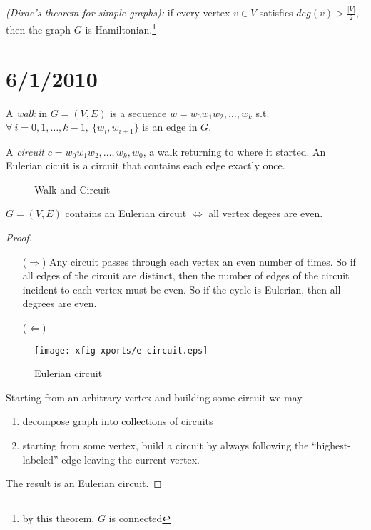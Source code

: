 \documentclass{article}
\begin{document}
\begin{thm}
\emph{(Dirac's theorem for simple graphs):} if every vertex $v \in V$ satisfies $deg(v)> \frac{|V|}{2}$, then the graph $G$ is Hamiltonian.\footnote{by this theorem, $G$ is connected}
\end{thm}




\section*{6/1/2010}

\begin{defn}
A \emph{walk} in $G=(V,E)$ is a sequence $w=w_0 w_1 w_2,\ldots,w_k$ s.t. $\forall ~i = 0,1,\ldots,k-1,~ \{w_i, w_{i+1}\}$ is an edge in $G$.
\end{defn}

\begin{defn}
A \emph{circuit} $c=w_0 w_1 w_2,\ldots,w_k,w_0$, a walk returning to where it started. An Eulerian cicuit is a circuit that contains each edge exactly once.
\end{defn}


\begin{figure}[H]
\centering
\caption{Walk and Circuit}
\qquad \quad
{}
\end{figure}



\begin{thm}
$G=(V,E)$ contains an Eulerian circuit $\iff$ all vertex degees are even.
\end{thm}

\begin{proof}
\begin{itemize}
{}    
 \item[($\Rightarrow$)] Any circuit passes through each vertex an even number of times.  So if all edges of the circuit are distinct, then the number of edges of the circuit incident to each vertex must be even.  So if the cycle is Eulerian, then all degrees are even.
\item[($\Leftarrow$)]
\end{itemize}
\begin{figure}[H]
\caption{Eulerian circuit}
\centering
\texttt{[image: xfig-xports/e-circuit.eps]}
\end{figure}


Starting from an arbitrary vertex and building some circuit we may
\begin{enumerate}
 \item decompose graph into collections of circuits
\item starting from some vertex, build a circuit by always following the ``highest-labeled'' edge leaving the current vertex.
\end{enumerate}
The result is an Eulerian circuit.
\end{proof}
\end{document}
